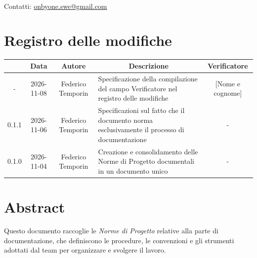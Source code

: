 \documentclass[11pt, a4paper]{article}
\begin{document}
\begin{titlepage}
    \vspace{0.5cm}
    
    {\large Contatti: \href{mailto:onbyone.swe@gmail.com}{onbyone.swe@gmail.com} }
    
\end{titlepage}

\newpage

\section*{Registro delle modifiche}

\vspace{1cm}
\begin{center}
    \renewcommand{\arraystretch}{1.5}
    \begin{tabularx}{\textwidth}{|c|c|c|X|c|}
        \hline
        \rowcolor{gray!10} 
        \multicolumn{1}{|c|}{\textbf{Versione}} & 
        \multicolumn{1}{c|}{\textbf{Data}} & 
        \multicolumn{1}{c|}{\textbf{Autore}} & 
        \multicolumn{1}{c|}{\textbf{Descrizione}} & 
        \multicolumn{1}{c|}{\textbf{Verificatore}} \\
        \hline
        - & 2026-11-08 & Federico Temporin & Specificazione della compilazione del campo Verificatore nel registro delle modifiche & [Nome e cognome] \\
        \hline
        0.1.1 & 2026-11-06 & Federico Temporin & Specificazioni sul fatto che il documento norma esclusivamente il processo di documentazione & - \\
        \hline
        0.1.0 & 2026-11-04 & Federico Temporin & Creazione e consolidamento delle Norme di Progetto documentali in un documento unico & - \\
        \hline
    \end{tabularx}
\end{center}
\vfill
\newpage

\hypersetup{linkcolor=black}
\tableofcontents
{}
\newpage

\section{Abstract}
Questo documento raccoglie le \textit{Norme di Progetto} relative alla parte di documentazione, che definiscono le procedure, le convenzioni e gli strumenti adottati dal team per organizzare e svolgere il lavoro.
\end{document}
